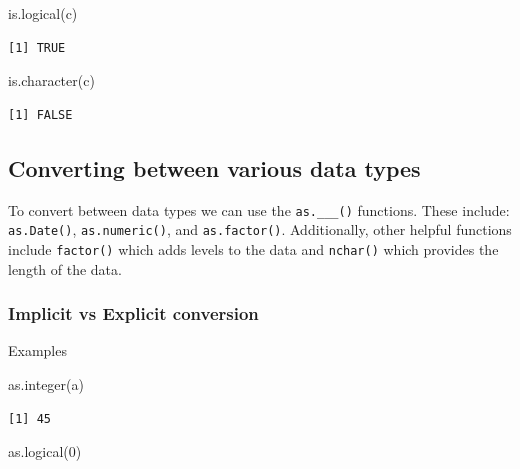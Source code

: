 \documentclass[
  letterpaper,
  DIV=11,
  numbers=noendperiod]{scrreprt}
\newenvironment{Shaded}{\begin{snugshade}}{\end{snugshade}}
\newcommand{\DecValTok}[1]{\textcolor[rgb]{0.68,0.00,0.00}{#1}}
\newcommand{\FunctionTok}[1]{\textcolor[rgb]{0.28,0.35,0.67}{#1}}
\newcommand{\NormalTok}[1]{\textcolor[rgb]{0.00,0.23,0.31}{#1}}
\begin{document}
\begin{Shaded}
\begin{Highlighting}[]
\FunctionTok{is.logical}\NormalTok{(c)}
\end{Highlighting}
\end{Shaded}

\begin{verbatim}
[1] TRUE
\end{verbatim}

\begin{Shaded}
\begin{Highlighting}[]
\FunctionTok{is.character}\NormalTok{(c)}
\end{Highlighting}
\end{Shaded}

\begin{verbatim}
[1] FALSE
\end{verbatim}

\subsection{Converting between various data
types}\label{converting-between-various-data-types}

To convert between data types we can use the \texttt{as.\_\_\_()}
functions. These include: \texttt{as.Date()}, \texttt{as.numeric()}, and
\texttt{as.factor()}. Additionally, other helpful functions include
\texttt{factor()} which adds levels to the data and \texttt{nchar()}
which provides the length of the data.

\subsubsection{Implicit vs Explicit
conversion}\label{implicit-vs-explicit-conversion}

Examples

\begin{Shaded}
\begin{Highlighting}[]
\FunctionTok{as.integer}\NormalTok{(a)}
\end{Highlighting}
\end{Shaded}

\begin{verbatim}
[1] 45
\end{verbatim}

\begin{Shaded}
\begin{Highlighting}[]
\FunctionTok{as.logical}\NormalTok{(}\DecValTok{0}\NormalTok{)}
\end{Highlighting}
\end{Shaded}
\end{document}
